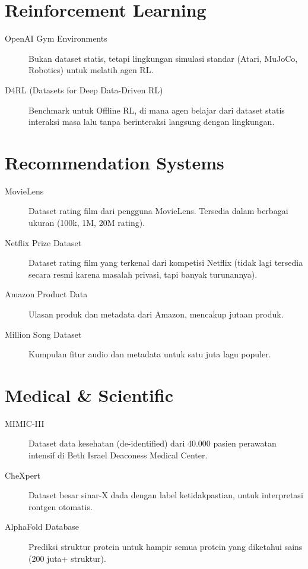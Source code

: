 \section{Reinforcement Learning}

\begin{description}
    \item[OpenAI Gym Environments] Bukan dataset statis, tetapi lingkungan simulasi standar (Atari, MuJoCo, Robotics) untuk melatih agen RL.
    \item[D4RL (Datasets for Deep Data-Driven RL)] Benchmark untuk Offline RL, di mana agen belajar dari dataset statis interaksi masa lalu tanpa berinteraksi langsung dengan lingkungan.
\end{description}

\section{Recommendation Systems}

\begin{description}
    \item[MovieLens] Dataset rating film dari pengguna MovieLens. Tersedia dalam berbagai ukuran (100k, 1M, 20M rating).
    \item[Netflix Prize Dataset] Dataset rating film yang terkenal dari kompetisi Netflix (tidak lagi tersedia secara resmi karena masalah privasi, tapi banyak turunannya).
    \item[Amazon Product Data] Ulasan produk dan metadata dari Amazon, mencakup jutaan produk.
    \item[Million Song Dataset] Kumpulan fitur audio dan metadata untuk satu juta lagu populer.
\end{description}

\section{Medical \& Scientific}

\begin{description}
    \item[MIMIC-III] Dataset data kesehatan (de-identified) dari 40.000 pasien perawatan intensif di Beth Israel Deaconess Medical Center.
    \item[CheXpert] Dataset besar sinar-X dada dengan label ketidakpastian, untuk interpretasi rontgen otomatis.
    \item[AlphaFold Database] Prediksi struktur protein untuk hampir semua protein yang diketahui sains (200 juta+ struktur).
\end{description}

